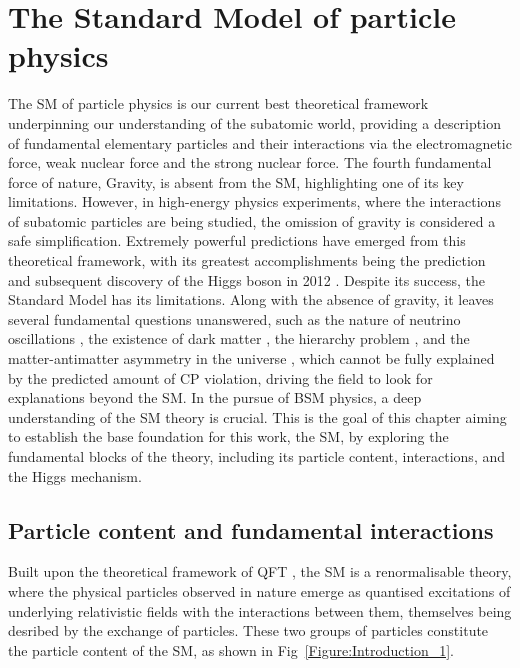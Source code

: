 \chapter{The Standard Model of particle physics}
\thispagestyle{plain}  %
\pagestyle{chapterpages}
The \ac{SM} of particle physics \cite{Glashow_StandardModel_1,Weinberg_StandardModel_1,StandardModel_3,Standard_Model4,StandardModel_3} is our current best theoretical framework underpinning our understanding of the subatomic world, providing a description of fundamental elementary particles and their interactions via the electromagnetic force, weak nuclear force and the strong nuclear force. The fourth fundamental force of nature, Gravity, is absent from the SM, highlighting one of its key limitations. However, in high-energy physics experiments, where the interactions of subatomic particles are being studied, the omission of gravity is considered a safe simplification. Extremely powerful predictions have emerged from this theoretical framework, with its greatest accomplishments being the prediction \cite{Higgs_1} and subsequent discovery of the Higgs boson in 2012 \cite{Higgs_ATLAS,Higgs_CMS}. Despite its success, the Standard Model has its limitations. Along with the absence of gravity, it leaves several fundamental questions unanswered, such as the nature of neutrino oscillations \cite{Neutrino_Oscillations}, the existence of dark matter \cite{DarkMatter}, the hierarchy problem \cite{HierarchyProblem}, and the matter-antimatter asymmetry in the universe \cite{MatterAntimatter}, which cannot be fully explained by the predicted amount of CP violation, driving the field to look for explanations beyond the SM. In the pursue of \ac{BSM} physics, a deep understanding of the SM theory is crucial. This is the goal of this chapter aiming to establish the base foundation for this work, the SM, by exploring the fundamental blocks of the theory, including its particle content, interactions, and the Higgs mechanism.

\section{Particle content and fundamental interactions}

Built upon the theoretical framework of \ac{QFT} \cite{QFT}, the SM is a renormalisable theory, where the physical particles observed in nature emerge as quantised excitations of underlying relativistic fields with the interactions between them, themselves being desribed by the exchange of particles. These two groups of particles constitute the particle content of the SM, as shown in Fig~\ref{Figure:Introduction_1}.

